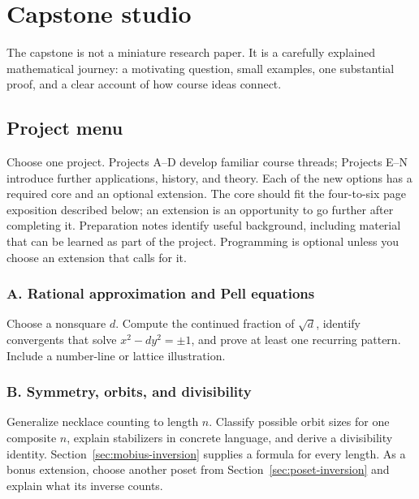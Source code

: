\chapter{Capstone studio}
\label{chap:capstone}

The capstone is not a miniature research paper. It is a carefully explained mathematical journey: a motivating question, small examples, one substantial proof, and a clear account of how course ideas connect.

\newenvironment{capstoneproject}{%
  \par\addvspace{\medskipamount}\noindent
  \begin{minipage}{\textwidth}\setlength{\parskip}{5pt}%
}{\end{minipage}\par\addvspace{\medskipamount}}

\section{Project menu}

Choose one project. Projects A--D develop familiar course threads;
Projects E--N introduce further applications, history, and theory.
Each of the new options has a required core and an optional extension.
The core should fit the four-to-six page exposition described below;
an extension is an opportunity to go further after completing it.
Preparation notes identify useful background, including material that
can be learned as part of the project. Programming is optional unless
you choose an extension that calls for it.

\subsection*{A. Rational approximation and Pell equations}
Choose a nonsquare $d$. Compute the continued fraction of $\sqrt d$, identify convergents that solve $x^2-dy^2=\pm1$, and prove at least one recurring pattern. Include a number-line or lattice illustration.

\subsection*{B. Symmetry, orbits, and divisibility}
Generalize necklace counting to length $n$. Classify possible orbit sizes for one composite $n$, explain stabilizers in concrete language, and derive a divisibility identity. Section~\ref{sec:mobius-inversion} supplies a formula for every length. As a bonus extension, choose another poset from Section~\ref{sec:poset-inversion} and explain what its inverse counts.

